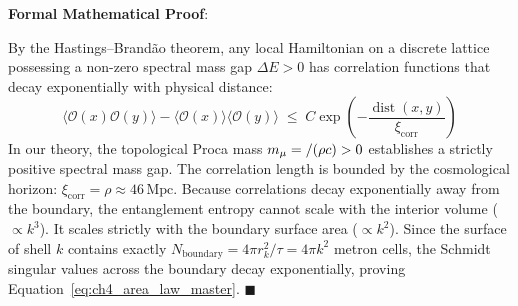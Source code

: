 \documentclass[
    12pt,
    a4paper,
    headings=normal,
    twoside=false,
    open=any,
    parskip=half
]{scrbook}
\let\hbar\relax
\newenvironment{myproof}[1][]{%
  \par\vspace{6pt}\noindent\textbf{\sffamily\color{maincolor}Formal Mathematical Proof\ifstrempty{#1}{}{ (#1)}}:\par\nopagebreak
}{%
  \penalty50\hfill\ensuremath{\blacksquare}\par\vspace{6pt}
}
\begin{document}
\begin{myproof}
By the Hastings--Brand\~{a}o theorem, any local Hamiltonian on a discrete lattice possessing a non-zero spectral mass gap $\Delta E > 0$ has correlation functions that decay exponentially with physical distance:
$$\langle \mathcal{O}(x) \mathcal{O}(y) \rangle - \langle \mathcal{O}(x) \rangle \langle \mathcal{O}(y) \rangle \;\le\; C \exp\left( -\frac{\operatorname{dist}(x, y)}{\xi_{\text{corr}}} \right)$$
In our theory, the topological Proca mass $m_\mu = \hbar / (\rho c) > 0$ establishes a strictly positive spectral mass gap. The correlation length is bounded by the cosmological horizon: $\xi_{\text{corr}} = \rho \approx 46\,\text{Mpc}$. Because correlations decay exponentially away from the boundary, the entanglement entropy cannot scale with the interior volume ($\propto k^3$). It scales strictly with the boundary surface area ($\propto k^2$).
Since the surface of shell $k$ contains exactly $N_{\text{boundary}} = 4\pi r_k^2 / \tau = 4\pi k^2$ metron cells, the Schmidt singular values across the boundary decay exponentially, proving Equation~\eqref{eq:ch4_area_law_master}.
\end{myproof}
\end{document}
